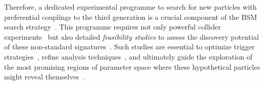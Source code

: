 Therefore, a dedicated experimental programme to search for new particles with preferential couplings to the third generation is a crucial component of the BSM search strategy~\cite{CMS:2020wzx,ATLAS:2019qpq}. This programme requires not only powerful collider experiments~\cite{ATLAS:2008xda,CMS:2008xjf} but also detailed \textit{feasibility studies} to assess the discovery potential of these non-standard signatures~\cite{Faroughy:2016osc,Baker:2019sli}. Such studies are essential to optimize trigger strategies~\cite{ATLAS:2008xda,CMS:2008xjf}, refine analysis techniques~\cite{Cowan:2011}, and ultimately guide the exploration of the most promising regions of parameter space where these hypothetical particles might reveal themselves~\cite{Dorsner:2016wpm}.
